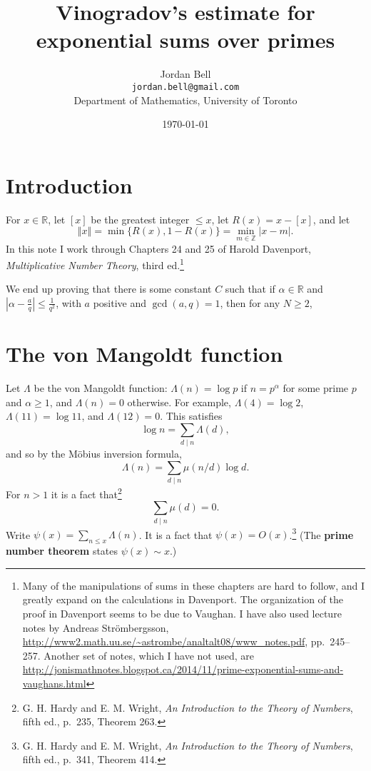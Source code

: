\documentclass{article}
\newcommand{\norm}[1]{\left\Vert #1 \right\Vert}
\theoremstyle{definition}
\begin{document}
\title{Vinogradov's estimate for exponential sums over primes}
\author{Jordan Bell\\ \texttt{jordan.bell@gmail.com}\\Department of Mathematics, University of Toronto}
\date{\today}

\maketitle

\section{Introduction}
For $x \in \mathbb{R}$, let $[x]$ be the greatest integer $\leq x$, let $R(x)=x-[x]$, and let
\[
\norm{x} = \min\{R(x),1-R(x)\} = \min_{m \in \mathbb{Z}} |x-m|.
\]
In this note I work through Chapters 24 and 25 of Harold Davenport, {\em Multiplicative Number Theory}, third ed.\footnote{Many of the manipulations of sums in these chapters are hard to follow, and I greatly expand on the calculations in
Davenport. The organization of the proof in Davenport seems to be due to Vaughan. I have also used lecture notes by
Andreas Str\"ombergsson,
\url{http://www2.math.uu.se/~astrombe/analtalt08/www_notes.pdf}, pp.~245--257. Another set of notes, which I have not used, are \url{http://jonismathnotes.blogspot.ca/2014/11/prime-exponential-sums-and-vaughans.html}}

We end up proving that there is some constant $C$ such that if $\alpha \in \mathbb{R}$ and $\left|\alpha - \frac{a}{q} \right| \leq
\frac{1}{q^2}$, with $a$ positive and $\gcd(a,q)=1$, then for any $N \geq 2$, 




\section{The von Mangoldt function}
Let $\Lambda$ be the von Mangoldt function: $\Lambda(n)=\log p$ if $n=p^\alpha$ for some prime $p$ and 
$\alpha \geq 1$, and $\Lambda(n)=0$ otherwise. For example, $\Lambda(4)=\log 2$, $\Lambda(11)=\log 11$,
and $\Lambda(12)=0$. This satisfies
\[
\log n = \sum_{d \mid n} \Lambda(d),
\]
and so by the M\"obius inversion formula,
\[
\Lambda(n) = \sum_{d \mid n} \mu(n/d) \log d.
\]
For $n>1$ it is a fact that\footnote{G. H. Hardy and E. M. Wright, {\em An Introduction to the Theory of Numbers},
fifth ed., p.~235, Theorem 263.}
\[
\sum_{d \mid n} \mu(d) = 0.
\]
Write $\psi(x) = \sum_{n \leq x} \Lambda(n)$. It is a fact that
$\psi(x) = O(x)$.\footnote{G. H. Hardy and E. M. Wright, {\em An Introduction to the Theory of Numbers},
fifth ed., p.~341, Theorem 414.} (The \textbf{prime number theorem} states $\psi(x) \sim x$.)
\end{document}
